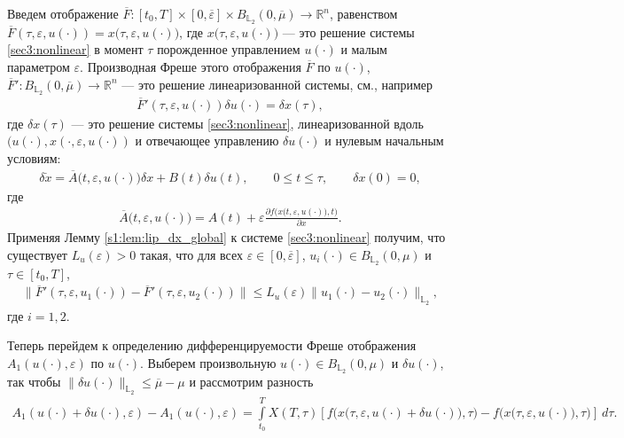 \documentclass[../main.tex]{subfiles}
\begin{document}
Введем отображение $\overline{F}: [t_0,T] \times [0,\overline{\varepsilon}] \times B_{\mathbb{L}_2}(0,\overline{\mu}) \to \mathbb{R}^n$, равенством $\overline{F}(\tau,\varepsilon, u(\cdot)) = x \big(\tau,\varepsilon, u(\cdot)\big) $, где $x \big(\tau,\varepsilon, u(\cdot)\big)$ --- это решение системы \eqref{sec3:nonlinear} в момент $\tau$ порожденное управлением $u(\cdot)$ и малым параметром  $\varepsilon$. 
Производная Фреше этого отображения $\overline{F}$ по $u(\cdot)$, $\overline{F}': B_{\mathbb{L}_2}(0,\overline{\mu}) \to \mathbb{R}^n $ --- это решение линеаризованной системы, см., например \cite{GusZyk}
\begin{gather}\label{dF}
    \overline{F}'(\tau,\varepsilon, u(\cdot)) \delta u(\cdot) = \delta x(\tau), 
\end{gather}
где $\delta x(\tau)$ --- это решение системы \eqref{sec3:nonlinear}, линеаризованной вдоль $(u(\cdot),x(\cdot,\varepsilon, u(\cdot))$ и отвечающее управлению $\delta u(\cdot)$ и нулевым начальным условиям:
\begin{gather}\label{dx}
    \delta\dot{x} =   \overline{A}\big(t,\varepsilon,u(\cdot)\big) \delta x +  B(t)\delta u(t), \qquad 0\leqslant t \leqslant \tau, \qquad \delta x(0) = 0,
\end{gather}
где
\begin{gather*}
    \overline{A}\big(t,\varepsilon,u(\cdot)\big) = A(t) +\varepsilon \frac{\partial f\big(x(t,\varepsilon,u(\cdot)\big),t\big)}{\partial x}.
\end{gather*}
Применяя Лемму \ref{s1:lem:lip_dx_global} к системе \eqref{sec3:nonlinear} получим, что существует $L_u(\varepsilon) > 0$ такая, что для всех $\varepsilon\in [0,\overline{\varepsilon}]$, $u_i(\cdot) \in B_{\mathbb{L}_2}(0,\mu)$ и $\tau \in [t_0,T]$, 
\begin{gather*}
	\| \overline{F}'(\tau,\varepsilon, u_1(\cdot)) - \overline{F}'(\tau,\varepsilon, u_2(\cdot)) \| \leqslant L_u(\varepsilon) \| u_1(\cdot) - u_2(\cdot) \|_{\mathbb{L}_2},
\end{gather*}
где $i = 1,2$.

Теперь перейдем к определению дифференцируемости Фреше отображения $A_1(u(\cdot),\varepsilon)$ по $u(\cdot)$.
Выберем произвольную $u(\cdot) \in B_{\mathbb{L}_2}(0,\mu)$ и $\delta u(\cdot)$, так чтобы $\|\delta u(\cdot)\|_{\mathbb{L}_2} \leqslant \overline{\mu}-\mu$ и рассмотрим разность
\begin{gather}\label{diff_A}
    A_1(u(\cdot) + \delta u(\cdot),\varepsilon) - A_1(u(\cdot) ,\varepsilon) = \int\limits_{t_0}^T X(T,\tau) \left[ 
    f\Big(x\big(\tau,\varepsilon, u(\cdot) + \delta u(\cdot)\big),\tau\Big) - 
    f\Big(x\big(\tau,\varepsilon, u(\cdot)\big),\tau\Big) \right]\ d\tau.
\end{gather}
\end{document}
